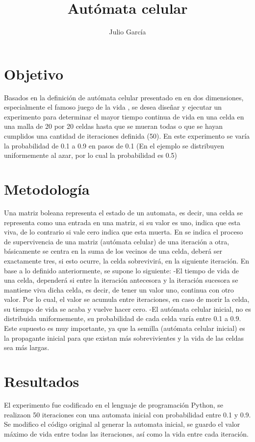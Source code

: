 \documentclass{article}
\title {Autómata celular}
\author{Julio Garc\'ia}
\begin{document}
\maketitle



\section{Objetivo}

Basados en la definición de autómata celular presentado en \citet{e1}
 en dos dimensiones, especialmente el famoso juego de la vida \citet{e2}
 , se desea diseñar y ejecutar un experimento para determinar el mayor tiempo continua de vida en una celda en una malla de 20 por 20 celdas hasta que se mueran todas o que se hayan cumplidos una cantidad de iteraciones definida (50). En este experimento se varía la probabilidad de 0.1 a 0.9 en pasos de 0.1 (En el ejemplo se distribuyen uniformemente al azar, por lo cual la probabilidad es 0.5) 


\section{Metodolog\'ia}
Una matriz boleana representa el estado de un automata, es decir, una celda se representa como una entrada en una matriz, si su valor es uno, indica que esta viva, de lo contrario si vale cero indica que esta muerta. En \citet{p2}
 se indica el proceso de supervivencia de una matriz (autómata celular) de una iteración a otra, básicamente se centra en la suma de los vecinos de una celda, deberá ser exactamente tres, si esto ocurre, la celda sobrevivirá, en la siguiente iteración. En base a lo definido anteriormente, se supone lo siguiente:
-El tiempo de vida de una celda, dependerá si entre la iteración antecesora y la iteración sucesora se mantiene viva dicha celda, es decir, de tener un valor uno, continua con otro valor. Por lo cual, el valor se acumula entre iteraciones, en caso de morir la celda, su tiempo de vida se acaba y vuelve hacer cero.
-El autómata celular inicial, no es distribuida uniformemente, su probabilidad de cada celda varía entre 0.1 a 0.9. Este supuesto es muy importante, ya que la semilla (autómata celular inicial) es la propagante inicial para que existan más sobrevivientes y la vida de las celdas sea más largas.


\newpage
\section{Resultados}
El experimento fue codificado en el lenguaje de programación Python, se realizaon 50 iteraciones con una automata inicial con probabilidad entre 0.1 y 0.9. Se modifico el código original al generar la automata inicial, se guardo el valor máximo de vida entre todas las iteraciones, así como la vida entre cada iteración. 
\end{document}
